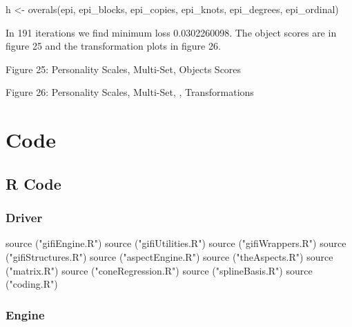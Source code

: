 \documentclass[
  12pt,
]{book}
\newenvironment{Shaded}{\begin{snugshade}}{\end{snugshade}}
\newcommand{\FunctionTok}[1]{\textcolor[rgb]{0.00,0.00,0.00}{#1}}
\newcommand{\NormalTok}[1]{#1}
\newcommand{\OtherTok}[1]{\textcolor[rgb]{0.56,0.35,0.01}{#1}}
\newcommand{\StringTok}[1]{\textcolor[rgb]{0.31,0.60,0.02}{#1}}
\begin{document}
\begin{Shaded}
\begin{Highlighting}[]
\NormalTok{h }\OtherTok{\textless{}{-}} \FunctionTok{overals}\NormalTok{(epi, epi\_blocks, epi\_copies, epi\_knots, epi\_degrees, epi\_ordinal)}
\end{Highlighting}
\end{Shaded}

In 191 iterations we find minimum loss 0.0302260098. The object scores are in figure
25 and the transformation plots in figure
26.

Figure 25: Personality Scales, Multi-Set, Objects Scores

Figure 26: Personality Scales, Multi-Set, , Transformations

\hypertarget{code}{%
\chapter{Code}\label{code}}

\hypertarget{r-code}{%
\section{R Code}\label{r-code}}

\hypertarget{driver}{%
\subsection{Driver}\label{driver}}

\begin{Shaded}
\begin{Highlighting}[]
\FunctionTok{source}\NormalTok{ (}\StringTok{"gifiEngine.R"}\NormalTok{)}
\FunctionTok{source}\NormalTok{ (}\StringTok{"gifiUtilities.R"}\NormalTok{)}
\FunctionTok{source}\NormalTok{ (}\StringTok{"gifiWrappers.R"}\NormalTok{)}
\FunctionTok{source}\NormalTok{ (}\StringTok{"gifiStructures.R"}\NormalTok{)}
\FunctionTok{source}\NormalTok{ (}\StringTok{"aspectEngine.R"}\NormalTok{)}
\FunctionTok{source}\NormalTok{ (}\StringTok{"theAspects.R"}\NormalTok{)}
\FunctionTok{source}\NormalTok{ (}\StringTok{"matrix.R"}\NormalTok{)}
\FunctionTok{source}\NormalTok{ (}\StringTok{"coneRegression.R"}\NormalTok{)}
\FunctionTok{source}\NormalTok{ (}\StringTok{"splineBasis.R"}\NormalTok{)}
\FunctionTok{source}\NormalTok{ (}\StringTok{"coding.R"}\NormalTok{)}
\end{Highlighting}
\end{Shaded}

\hypertarget{engine}{%
\subsection{Engine}\label{engine}}
\end{document}
